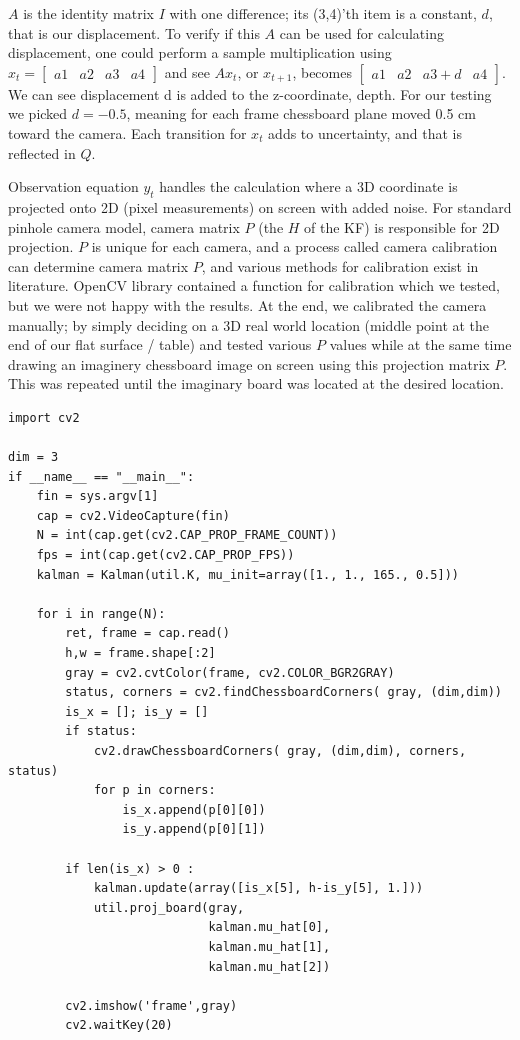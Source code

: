 \documentclass{article}
\begin{document}
$A$ is the identity matrix $I$ with one difference; its (3,4)'th item is a
constant, $d$, that is our displacement. To verify if this $A$ can be used for
calculating displacement, one could perform a sample multiplication using $x_t =
[\begin{array}{cccc}a1 & a2 & a3 & a4 \end{array}]$ and see $Ax_t$, or
$x_{t+1}$, becomes $[\begin{array}{cccc}a1 & a2 & a3+d & a4\end{array}]$. We can
see displacement d is added to the z-coordinate, depth. For our testing we
picked $d = -0.5$, meaning for each frame chessboard plane moved 0.5 cm toward
the camera. Each transition for $x_t$ adds to uncertainty, and that is reflected
in $Q$.

Observation equation $y_t$ handles the calculation where a 3D coordinate is
projected onto 2D (pixel measurements) on screen with added noise. For standard
pinhole camera model, camera matrix $P$ (the $H$ of the KF) is responsible for
2D projection. $P$ is unique for each camera, and a process called camera
calibration can determine camera matrix $P$, and various methods for calibration
exist in literature. OpenCV library contained a function for calibration which
we tested, but we were not happy with the results. At the end, we calibrated the
camera manually; by simply deciding on a 3D real world location (middle point at
the end of our flat surface / table) and tested various $P$ values while at the
same time drawing an imaginery chessboard image on screen using this projection
matrix $P$. This was repeated until the imaginary board was located at the
desired location.

\begin{verbatim}
import cv2

dim = 3
if __name__ == "__main__":    
    fin = sys.argv[1]
    cap = cv2.VideoCapture(fin)
    N = int(cap.get(cv2.CAP_PROP_FRAME_COUNT))
    fps = int(cap.get(cv2.CAP_PROP_FPS))
    kalman = Kalman(util.K, mu_init=array([1., 1., 165., 0.5]))
    
    for i in range(N):
        ret, frame = cap.read()
        h,w = frame.shape[:2]
        gray = cv2.cvtColor(frame, cv2.COLOR_BGR2GRAY)
        status, corners = cv2.findChessboardCorners( gray, (dim,dim))
        is_x = []; is_y = []
        if status: 
            cv2.drawChessboardCorners( gray, (dim,dim), corners, status)
            for p in corners:
                is_x.append(p[0][0])
                is_y.append(p[0][1])

        if len(is_x) > 0 : 
            kalman.update(array([is_x[5], h-is_y[5], 1.]))
            util.proj_board(gray, 
                            kalman.mu_hat[0], 
                            kalman.mu_hat[1], 
                            kalman.mu_hat[2])

        cv2.imshow('frame',gray)
        cv2.waitKey(20)    
\end{verbatim}
\end{document}
